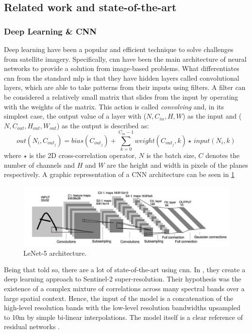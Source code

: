\documentclass[../main.tex]{subfiles}
\begin{document}
\subsection{Related work and state-of-the-art}\label{sec:soa}
\subsubsection{Deep Learning \& CNN}
Deep learning have been a popular and efficient technique to solve challenges from satellite imagery. Specifically, \gls{cnn} have been the main architecture of neural networks to provide a solution from image-based problems. What differentiates \gls{cnn} from the standard \gls{mlp} is that they have hidden layers called convolutional layers, which are able to take patterns from their inputs using filters. A filter can be considered a relatively small matrix that slides from the input by operating with the weights of the matrix. This action is called \textit{convolving }and, in its simplest case, the output value of a layer with ($N, C_{in}, H, W$) as the input and ($N, C_{out}, H_{out}, W_{out}$) as the output is described as:
\[out(N_i, C_{out_j}) = bias(C_{out_j}) + \sum_{k=0}^{C_{in} - 1} weight(C_{out_j}, k) \star \, input(N_i, k)\]
where $\star$ is the 2D cross-correlation operator, $N$ is the batch size, $C$ denotes the number of channels and $H$ and $W$ are the height and width in pixels of the planes respectively. A graphic representation of a CNN architecture can be seen in \ref{fig:related-lenet}
\begin{figure}[H]
	\centering
	\includegraphics[width=14cm]{imgs/relatedwork/lenet-5.jpeg}
	\caption{LeNet-5 architecture.}
	\label{fig:related-lenet}
\end{figure}
Being that told so, there are a lot of state-of-the-art using \gls{cnn}. In \cite{LANARAS2018305}, they create a deep learning approach to Sentinel-2 super-resolution. Their hypothesis was the existence of a complex mixture of correlations across many spectral bands over a large spatial context. Hence, the input of the model is a concatenation of the high-level resolution bands with the low-level resolution bandwidths upsampled to 10m by simple bi-linear interpolations. The model itself is a clear reference of residual networks \cite{he2016deep}.
\end{document}
